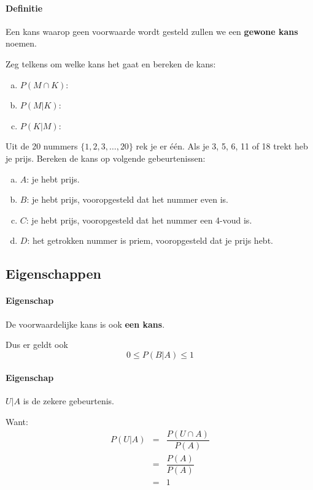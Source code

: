 \documentclass[12pt,twoside]{article}
\begin{document}
\paragraph*{Definitie} Een kans waarop geen voorwaarde wordt gesteld zullen we een {\bf gewone kans} noemen.

\begin{oefening}
Zeg telkens om welke kans het gaat en bereken de kans:
\begin{enumerate}[(a)]
  \item $P(M\cap K)$:\arulefill
  \item $P(M|K)$:\arulefill
  \item $P(K|M)$:\arulefill
\end{enumerate}
\end{oefening}

\begin{oefening}
Uit de 20 nummers $\{1,2,3,\ldots,20\}$ rek je er één. Als je 3, 5, 6, 11 of 18 trekt heb je
prijs. Bereken de kans op volgende gebeurtenissen:
\begin{enumerate}[(a)]
  \item $A$: je hebt prijs.
  \item $B$: je hebt prijs, vooropgesteld dat het nummer even is.
  \item $C$: je hebt prijs, vooropgesteld dat het nummer een 4-voud is.
  \item $D$: het getrokken nummer is priem, vooropgesteld dat je prijs hebt.
\end{enumerate}
\end{oefening}

\subsection{Eigenschappen}

\paragraph*{Eigenschap} De voorwaardelijke kans is ook {\bf een kans}.

Dus er geldt ook
$$0\leq P(B|A)\leq 1$$

\paragraph*{Eigenschap} $U|A$ is de zekere gebeurtenis.

Want:
\begin{eqnarray*}
  P(U|A) &=& \dfrac{P(U\cap A)}{P(A)}\\
         &=& \dfrac{P(A)}{P(A)}\\
         &=& 1
\end{eqnarray*}
\end{document}
